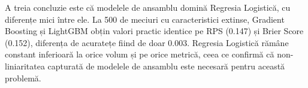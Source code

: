 A treia concluzie este că modelele de ansamblu domină Regresia Logistică,
cu diferențe mici între ele. La 500 de meciuri cu caracteristici extinse,
Gradient Boosting și LightGBM obțin valori practic identice pe RPS (0.147)
și Brier Score (0.152), diferența de acuratețe fiind de doar 0.003.
Regresia Logistică rămâne constant inferioară la orice volum și pe orice
metrică, ceea ce confirmă că non-liniaritatea capturată de modelele de
ansamblu este necesară pentru această problemă.

